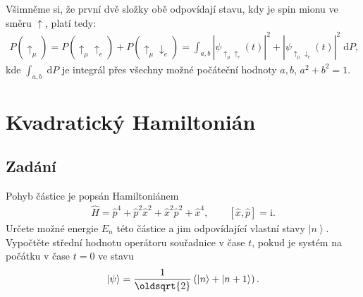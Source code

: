 \documentclass[10pt,a4paper]{article}
\newcommand{\comm}[2]{\left[ #1, #2 \right]}
\newcommand{\const}[1]{\text{#1}}
\renewcommand{\d}[1]{\;\const{d}#1}
\newcommand{\ket}[1]{\left| #1 \right>}
\renewcommand{\i}{\const{i}}
\begin{document}
Všimněme si, že první dvě složky obě odpovídají stavu, kdy je spin mionu ve směru $\uparrow$, platí tedy:
\begin{align*}
    P(\uparrow_\mu) = P(\uparrow_\mu \uparrow_e) + P(\uparrow_\mu \downarrow_e) = \int_{a,b} |\psi_{\uparrow_\mu\uparrow_e}(t)|^2 + |\psi_{\uparrow_\mu\downarrow_e}(t)|^2 \d{P},
\end{align*}
kde $\int_{a,b} \d{P}$ je integrál přes všechny možné počáteční hodnoty $a, b$, $a^2 + b^2 = 1$.



\section{Kvadratický Hamiltonián}
\subsection{Zadání}
Pohyb částice je popsán Hamiltoniánem
\begin{align*}
    \hat{H}
    = \hat{p}^4
    + \hat{p}^2 \hat{x}^2
    + \hat{x}^2 \hat{p}^2
    + \hat{x}^4,
    \hspace{2em}
    \comm{\hat{x}}{\hat{p}} = \i.
\end{align*}
Určete možné energie $E_n$ této částice a jim odpovídající vlastní stavy $\ket{n}$. Vypočtěte střední hodnotu operátoru souřadnice v čase $t$, pokud je systém na počátku v čase $t=0$ ve stavu
\begin{align*}
    \ket{\psi} =
    \frac{1}{\oldsqrt{2}}
    \left( \ket{n} + \ket{n+1} \right).
\end{align*}
\end{document}
